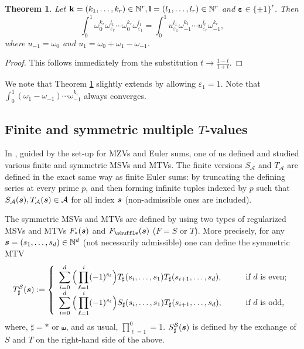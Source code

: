 \documentclass{article}
\newcommand{\sha}{\shuffle}
\newcommand{\Sy}{{\mathcal S}}
\newcommand\om{{\omega}}
\newcommand\eps{{\varepsilon}}
\newcommand{\bfk}{{\bf k}}
\newcommand{\bfl}{{\bf l}}
\newcommand{\bfs}{{\boldsymbol{\sl{s}}}}
\newcommand\bfeps{{\boldsymbol \varepsilon}}
\newcommand{\calA}{\mathcal{A}}
\newcommand{\N}{\mathbb{N}}
\theoremstyle{plain}
\newtheorem{thm}{Theorem}[section]
\theoremstyle{definition}
\begin{document}
\begin{thm} \label{thm:dualMMVo}
Let $\bfk=(k_1,\ldots,k_r)\in\N^r,\bfl=(l_1,\ldots,l_r)\in\N^r$ and $\bfeps\in\{\pm 1\}^r$.
Then
\begin{equation}\label{equ:dualMMV}
 \int_0^1 \om_0^{k_r} \om_{\eps_r}^{l_1} \cdots \om_0^{k_r}\om_{\eps_1}^{l_1}
=\int_0^1  u_{\eps_1}^{l_1} \om_{-1}^{k_1}  \cdots u_{\eps_r}^{l_r} \om_{-1}^{k_r}  ,
\end{equation}
where $u_{-1}=\om_0$ and $u_1=\om_0+\om_1-\om_{-1}$.
\end{thm}
\begin{proof}
This follows immediately from the substitution $t\to \frac{1-t}{1+t}$.
\end{proof}

We note that Theorem \ref{thm:dualMMVo} slightly extends \cite[Thm. 2.13]{XuZhao2020a} by allowing $\eps_1=1$. Note that
$\int_0^1 (\om_1-\om_{-1}) \cdots \om_{-1}^{k_r}$ always converges.



\subsection{Finite and symmetric multiple $T$-values}
In \cite{Zhao2023Dec,Zhao2024a}, guided by the set-up for MZVs and Euler sums, one of us defined and studied various finite and symmetric MSVs and MTVs. The finite versions $S_\calA$ and $T_\calA$ are defined in the exact same way as finite Euler sums: by truncating the defining series at every prime $p$, and then forming infinite tuples indexed by $p$ such that $S_\calA(\bfs),T_\calA(\bfs)\in\calA$ for all index $\bfs$ (non-admissible ones are included).

The symmetric MSVs and MTVs are defined by using two types of regularized MSVs and MTVs $F_\ast(\bfs)$ and $F_\sha(\bfs)$ ($F=S$ or $T$). More precisely, for any $\bfs=(s_1,\dots,s_d)\in\N^d$ (not necessarily admissible) one can define the symmetric MTV
\begin{equation*}
T_\sharp^\Sy(\bfs):=
\left\{
  \begin{array}{ll}
  \displaystyle \sum_{i=0}^d  \Big(\prod_{\ell=1}^i (-1)^{s_\ell} \Big) T_\sharp(s_i,\dots,s_1)T_\sharp(s_{i+1},\dots,s_d),\quad & \quad \hbox{if $d$ is even;} \\
  \displaystyle \sum_{i=0}^d  \Big(\prod_{\ell=1}^i (-1)^{s_\ell} \Big) S_\sharp(s_i,\dots,s_1)T_\sharp(s_{i+1},\dots,s_d), \quad&\quad \hbox{if $d$ is odd,}
  \end{array}
\right.
\end{equation*}
where, $\sharp=\ast$ or $\sha$, and as usual, $\prod_{\ell=1}^0=1$. $S_\sharp^\Sy(\bfs)$ is defined by the exchange of $S$ and $T$ on the right-hand side of the above.
\end{document}
